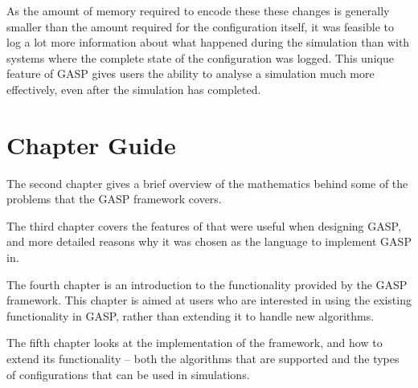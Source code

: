 As the amount of memory required to encode these these changes is
generally smaller than the amount required for the configuration
itself, it was feasible to log a lot more information about what
happened during the simulation than with systems where the complete
state of the configuration was logged.  This unique feature of GASP
gives users the ability to analyse a simulation much more effectively,
even after the simulation has completed.

\section{Chapter Guide}

The second chapter gives a brief overview of the mathematics behind
some of the problems that the GASP framework covers.

The third chapter covers the features of \GAP{} that were useful when
designing GASP, and more detailed reasons why it was chosen as the
language to implement GASP in.

The fourth chapter is an introduction to the functionality provided by
the GASP framework.  This chapter is aimed at users who are interested
in using the existing functionality in GASP, rather than extending it
to handle new algorithms.

The fifth chapter looks at the implementation of the framework, and
how to extend its functionality -- both the algorithms that are
supported and the types of configurations that can be used in
simulations.

